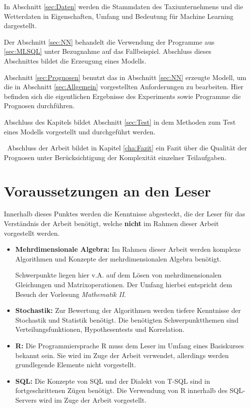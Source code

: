 In Abschnitt \ref{sec:Daten} werden die Stammdaten des Taxiunternehmens und die Wetterdaten in Eigenschaften, Umfang und Bedeutung für Machine Learning dargestellt. 

Der Abschnitt \ref{sec:NN} behandelt die Verwendung der Programme aus \ref{sec:MLSQL} unter Bezugnahme auf das Fallbeispiel. Abschluss dieses Abschnittes bildet die Erzeugung eines Modells. 

Abschnitt \ref{sec:Prognosen} benutzt das in Abschnitt \ref{sec:NN} erzeugte Modell, um die in Abschnitt \ref{sec:Allgemein} vorgestellten Anforderungen zu bearbeiten. Hier befinden sich die eigentlichen Ergebnisse des Experiments sowie Programme die Prognosen durchführen.

Abschluss des Kapitels bildet Abschnitt \ref{sec:Test} in dem Methoden zum Test eines Modells vorgestellt und durchgeführt werden. 

~\newline Abschluss der Arbeit bildet in Kapitel \ref{cha:Fazit} ein Fazit über die Qualität der Prognosen unter Berücksichtigung der Komplexität einzelner Teilaufgaben.
\section{Voraussetzungen an den Leser}
\label{sec:Vorraussetzungen}
Innerhalb dieses Punktes werden die Kenntnisse abgesteckt, die der Leser für das Verständnis der Arbeit benötigt, welche \textbf{nicht} im Rahmen dieser Arbeit vorgestellt werden. 

\begin{itemize}
	\item \textbf{Mehrdimensionale Algebra:} Im Rahmen dieser Arbeit werden komplexe Algorithmen und Konzepte der mehrdimensionalen Algebra benötigt. 
	
	Schwerpunkte liegen hier v.A. auf dem Lösen von mehrdimensionalen Gleichungen und Matrixoperationen. Der Umfang hierbei entspricht dem Besuch der Vorlesung \textit{Mathematik II}. 
	\item \textbf{Stochastik:}  Zur Bewertung der Algorithmen werden tiefere Kenntnisse der Stochastik und Statistik benötigt. Die benötigten Schwerpunktthemen sind Verteilungsfunktionen, Hypothesentests und Korrelation. 
	\item \textbf{R:} Die Programmiersprache R muss dem Leser im Umfang eines Basiskurses bekannt sein. Sie wird im Zuge der Arbeit verwendet, allerdings werden grundlegende Elemente nicht vorgestellt. 
	\item \textbf{SQL:} Die Konzepte von SQL und der Dialekt von T-SQL sind in fortgeschrittenen Zügen benötigt. Die Verwendung von R innerhalb des SQL-Servers wird im Zuge der Arbeit vorgestellt. 
\end{itemize}
